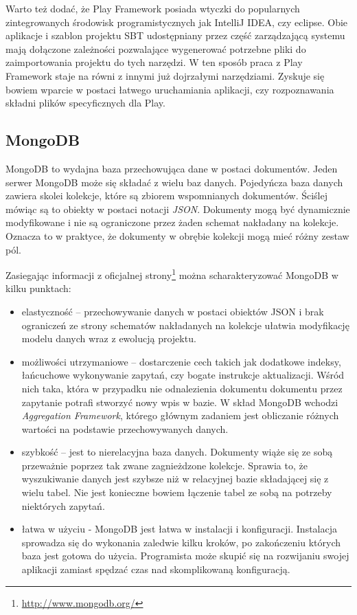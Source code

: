 \documentclass[brudnopis]{xmgr}
\begin{document}
Warto też dodać, że Play Framework posiada wtyczki do popularnych zintegrowanych środowisk programistycznych jak IntelliJ IDEA, czy eclipse. Obie aplikacje i szablon projektu SBT udostępniany przez część zarządzającą systemu mają dołączone zależności pozwalające wygenerować potrzebne pliki do zaimportowania projektu do tych narzędzi. W ten sposób praca z Play Framework staje na równi z innymi już dojrzałymi narzędziami. Zyskuje się bowiem wparcie w postaci łatwego uruchamiania aplikacji, czy rozpoznawania składni plików specyficznych dla Play.

\subsection{MongoDB}

MongoDB to wydajna baza przechowująca dane w postaci dokumentów. Jeden serwer MongoDB może się składać z wielu baz danych. Pojedyńcza baza danych zawiera skolei kolekcje, które są zbiorem wspomnianych dokumentów. Ściślej mówiąc są to obiekty w postaci notacji \emph{JSON}. Dokumenty mogą być dynamicznie modyfikowane i nie są ograniczone przez żaden schemat nakładany na kolekcje. Oznacza to w praktyce, że dokumenty w obrębie kolekcji mogą mieć różny zestaw pól.

Zasiegając informacji z oficjalnej strony\footnote{\url{http://www.mongodb.org/}} można scharakteryzować MongoDB w kilku punktach:

\begin{itemize}
\item elastyczność -- przechowywanie danych w postaci obiektów JSON i brak ograniczeń ze strony schematów nakładanych na kolekcje ułatwia modyfikację modelu danych wraz z ewolucją projektu.
\item możliwości utrzymaniowe -- dostarczenie cech takich jak dodatkowe indeksy, łańcuchowe wykonywanie zapytań, czy bogate instrukcje aktualizacji. Wśród nich taka, która w przypadku nie odnalezienia dokumentu dokumentu przez zapytanie potrafi stworzyć nowy wpis w bazie. W skład MongoDB wchodzi \emph{Aggregation Framework}, którego głównym zadaniem jest obliczanie różnych wartości na podstawie przechowywanych danych.
\item szybkość -- jest to nierelacyjna baza danych. Dokumenty wiąże się ze sobą przeważnie poprzez tak zwane zagnieżdzone kolekcje. Sprawia to, że wyszukiwanie danych jest szybsze niż w relacyjnej bazie składającej się z wielu tabel. Nie jest konieczne bowiem łączenie tabel ze sobą na potrzeby niektórych zapytań.
\item łatwa w użyciu - MongoDB jest łatwa w instalacji i konfiguracji. Instalacja sprowadza się do wykonania zaledwie kilku kroków, po zakończeniu których baza jest gotowa do użycia. Programista może skupić się na rozwijaniu swojej aplikacji zamiast spędzać czas nad skomplikowaną konfiguracją.
\end{itemize}
\end{document}
